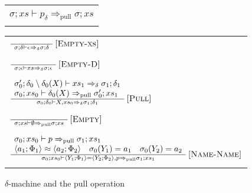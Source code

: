 \documentclass[a4paper,UKenglish]{lipics-v2016}
\makeatletter
\newenvironment*{premises}{\begin{array}{@{}l@{}}}{\end{array}}
\newcommand*{\infrule}[2]{\frac{\hspace{1ex}\vphantom{()}#1\hspace{1ex}}{\hspace{1ex}\vphantom{()}#2\hspace{1ex}}}
\newcommand*{\RNAME}[1]{\,\ensuremath{\textsc{[#1]}}}
\newcommand{\clos}[2] {
  \langle #1; #2 \rangle
}
\newcommand{\dframe}[5] {
  #1; #2 \vdash #3 \Rightarrow_\delta #4; #5
}
\newcommand{\pframe}[5] {
  #1; #2 \vdash #3 \Rightarrow_\textrm{pull} #4; #5
}
\newcommand{\eq}[2] {
 #1 = #2
}
\newcommand{\aeq}[4] {
  \clos{#1}{#2} \approx \clos{#3}{#4}
}
\makeatother
\begin{document}
\begin{figure}[htbp]
  \begin{minipage}[b]{\textwidth}
  \caption{$\delta$-machine and the pull operation}\label{machine:delta}
  \begin{tabular}{c}
    \fbox{\begin{varwidth}{\textwidth}
        $\dframe{\sigma}{p_\delta}{xs}{\sigma}{p_\delta}$ \\
        $\pframe{\sigma}{xs}{p_\delta}{\sigma}{xs}$
        \end{varwidth}} \\ \\
  \end{tabular}
  \end{minipage}

\begin{minipage}[b]{0.4\textwidth}
  \begin{tabular}{l}

    $\infrule{%
    }{\dframe{\sigma}{\delta}{\epsilon}{\sigma}{\delta}}
    \RNAME{Empty-xs}$ \\ \\

    $\infrule{%
    }{\dframe{\sigma}{\epsilon}{xs}{\sigma}{\epsilon}}
    \RNAME{Empty-D}$ \\ \\

    $\infrule{%
        \begin{premises}
          \dframe{\sigma_0'}{\delta_0 \setminus \delta_0(X)}{xs_1}{\sigma_1}{\delta_1} \\
          \pframe{\sigma_0}{xs_0}{\delta_0(X)}{\sigma_0'}{xs_1}
    \end{premises}
    }{\dframe{\sigma_0}{\delta_0}{X, xs_0}{\sigma_1}{\delta_1}}
    \RNAME{Pull}$ \\ \\

    $\infrule{%
    }{\pframe{\sigma}{xs}{\emptyset}{\sigma}{xs}}
    \RNAME{Empty}$ \\ \\

    $\infrule{%
        \begin{premises}
    \pframe{\sigma_0}{xs_0}{p}{\sigma_1}{xs_1} \\
    \aeq{a_1}{\Phi_1}{a_2}{\Phi_2} \quad \sigma_0(Y_1) = a_1 \quad \sigma_0(Y_2) = a_2 
    \end{premises}
    }{\pframe{\sigma_0}{xs_0}{\eq{\clos{Y_1}{\Phi_1}}{\clos{Y_2}{\Phi_2}}, p}{\sigma_1}{xs_1}}
    \RNAME{Name-Name}$ \\ \\


\end{tabular}
\end{minipage}
\end{figure}
\end{document}
